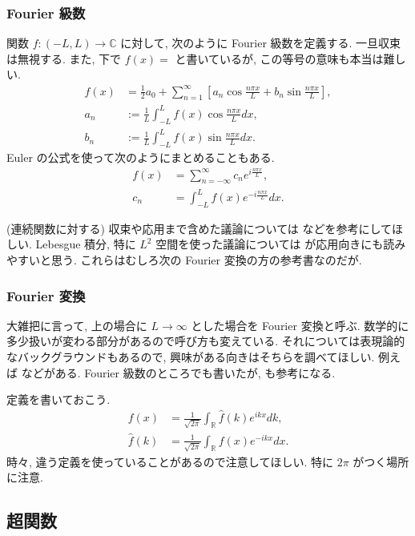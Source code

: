\documentclass[openany, a4paper, oneside]{jsbook}
\begin{document}
\subsubsection{Fourier 級数}

関数 $f \colon (-L, L) \to \mathbb{C}$ に対して, 次のように Fourier 級数を定義する.
一旦収束は無視する.
また, 下で $f (x) =$ と書いているが, この等号の意味も本当は難しい.
\begin{align}
 f (x)
 & =
   \frac{1}{2}a_0 + \sum_{n=1}^{\infty}
   \left[ a_n \cos \frac{n \pi x}{L} + b_n \sin \frac{n \pi x}{L} \right], \\
 a_n
 &:=
 \frac{1}{L} \int_{- L}^{L} f (x) \cos \frac{n \pi x}{L} dx, \\
 b_n
 &:=
 \frac{1}{L} \int_{- L}^{L} f (x) \sin \frac{n \pi x}{L} dx.
\end{align}
Euler の公式を使って次のようにまとめることもある.
\begin{align}
 f (x)
 &=
 \sum_{n = - \infty}^{\infty} c_n e^{i \frac{n \pi x}{L}}, \\
 c_n
 &=
 \int_{- L}^{L} f (x) e^{- i \frac{n \pi x}{L}} dx.
\end{align}

(連続関数に対する) 収束や応用まで含めた議論については \cite{KimYamamoto1} などを参考にしてほしい.
Lebesgue 積分, 特に $L^2$ 空間を使った議論については \cite{SeizoIto1, LiebLoss1} が応用向きにも読みやすいと思う.
これらはむしろ次の Fourier 変換の方の参考書なのだが.
\subsubsection{Fourier 変換}

大雑把に言って, 上の場合に $L \to \infty$ とした場合を Fourier 変換と呼ぶ.
数学的に多少扱いが変わる部分があるので呼び方も変えている.
それについては表現論的なバックグラウンドもあるので, 興味がある向きはそちらを調べてほしい.
例えば \cite{KobayashiOshima1} などがある.
Fourier 級数のところでも書いたが, \cite{SeizoIto1, LiebLoss1} も参考になる.

定義を書いておこう.
\begin{align}
 f (x)
 &=
 \frac{1}{\sqrt{2 \pi}} \int_{ \mathbb{R}} \hat{f}(k) e^{ik x} d k, \\
 \hat{f}(k)
 &=
 \frac{1}{\sqrt{2 \pi}}  \int_{\mathbb{R}} f (x) e^{-ik x} dx.
\end{align}
時々, 違う定義を使っていることがあるので注意してほしい.
特に $2 \pi$ がつく場所に注意.
\subsection{超関数}
\end{document}
